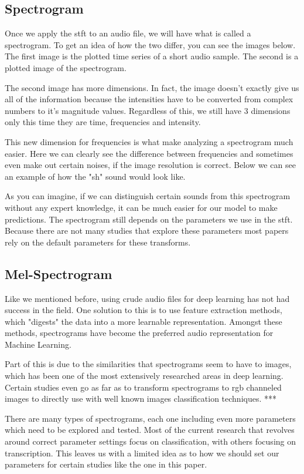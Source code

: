 \documentclass{book}
\begin{document}
\subsection{Spectrogram}
Once we apply the stft to an audio file, we will have what is called a spectrogram.
To get an idea of how the two differ, you can see the images below. The first image is the plotted time series of a short audio sample.
The second is a plotted image of the spectrogram.
\par
The second image has more dimensions.
In fact, the image doesn't exactly give us all of the information because the intensities have to be converted from complex numbers to it's magnitude values.
Regardless of this, we still have 3 dimensions only this time they are time, frequencies and intensity.
\par
This new dimension for frequencies is what make analyzing a spectrogram much easier.
Here we can clearly see the difference between frequencies and sometimes even make out certain noises, if the image resolution is correct.
Below we can see an example of how the "sh" sound would look like.
\par
As you can imagine, if we can distinguish certain sounds from this spectrogram without any expert knowledge, it can be much easier for our model to make predictions.
The spectrogram still depends on the parameters we use in the stft.
Because there are not many studies that explore these parameters most papers rely on the default parameters for these transforms.
\subsection{Mel-Spectrogram}
\qquad Like we mentioned before, using crude audio files for deep learning has not had success in the field.
One solution to this is to use feature extraction methods, which "digests" the data into a more learnable representation.
Amongst these methods, spectrograms have become the preferred audio representation for Machine Learning.
\par
Part of this is due to the similarities that spectrograms seem to have to images, which has been one of the most extensively researched areas in deep learning.
Certain studies even go as far as to transform spectrograms to rgb channeled images to directly use with well known images classification techniques. *** %
\par
There are many types of spectrograms, each one including even more parameters which need to be explored and tested.
Most of the current research that revolves around correct parameter settings focus on classification, with others focusing on transcription.
This leaves us with a limited idea as to how we should set our parameters for certain studies like the one in this paper.
\par
\end{document}
